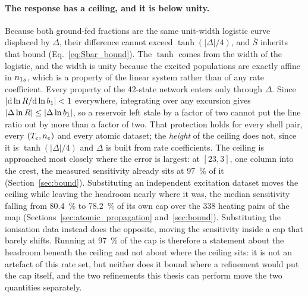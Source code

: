 \paragraph{The response has a ceiling, and it is below unity.} Because both
ground-fed fractions are the same unit-width logistic curve displaced by
$\Delta$, their difference cannot exceed $\tanh(|\Delta|/4)$, and $\overline{S}$
inherits that bound (Eq.~\eqref{eq:Sbar_bound}). The $\tanh$ comes from the
width of the logistic, and the width is unity because the excited populations
are exactly affine in $n_{1s}$, which is a property of the linear system rather
than of any rate coefficient. Every property of the 42-state network enters only
through $\Delta$. Since $|\mathrm{d}\ln R/\mathrm{d}\ln b_1| < 1$ everywhere,
integrating over any excursion gives $|\Delta\ln R| \le |\Delta\ln b_1|$, so a
reservoir left stale by a factor of two cannot put the line ratio out by more
than a factor of two. That protection holds for every shell pair, every
$(T_e,n_e)$ and every atomic dataset; the \emph{height} of the ceiling does
not, since it is $\tanh(|\Delta|/4)$ and $\Delta$ is built from rate
coefficients. The ceiling is approached most closely where the error is largest:
at $[23,3]$, one column into the crest, the measured sensitivity already sits at
\SI{97}{\percent} of it (Section~\ref{sec:bound}). Substituting an independent
excitation dataset moves the ceiling while leaving the headroom nearly where it
was, the median sensitivity falling from \SI{80.4}{\percent} to
\SI{78.2}{\percent} of its own cap over the $338$ heating pairs of the map
(Sections~\ref{sec:atomic_propagation} and~\ref{sec:bound}). Substituting the
ionisation data instead does the opposite, moving the sensitivity inside a cap
that barely shifts. Running at \SI{97}{\percent} of the cap is therefore a
statement about the headroom beneath the ceiling and not about where the ceiling
sits: it is not an artefact of this rate set, but neither does it bound where a
refinement would put the cap itself, and the two refinements this thesis can
perform move the two quantities separately.

